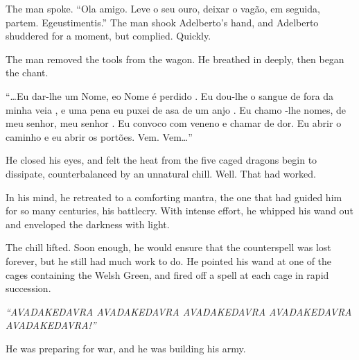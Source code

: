 The man spoke. “Ola amigo. Leve o seu ouro, deixar o vagão, em seguida, partem. Egeustimentis.” The man shook Adelberto’s hand, and Adelberto shuddered for a moment, but complied. Quickly.

The man removed the tools from the wagon. He breathed in deeply, then began the chant.

“…Eu dar-lhe um Nome, eo Nome é perdido . Eu dou-lhe o sangue de fora da minha veia , e uma pena eu puxei de asa de um anjo . Eu chamo -lhe nomes, de meu senhor, meu senhor . Eu convoco com veneno e chamar de dor. Eu abrir o caminho e eu abrir os portões. Vem. Vem…”

He closed his eyes, and felt the heat from the five caged dragons begin to dissipate, counterbalanced by an unnatural chill. Well. That had worked.

In his mind, he retreated to a comforting mantra, the one that had guided him for so many centuries, his battlecry. With intense effort, he whipped his wand out and enveloped the darkness with light.

The chill lifted. Soon enough, he would ensure that the counterspell was lost forever, but he still had much work to do. He pointed his wand at one of the cages containing the Welsh Green, and fired off a spell at each cage in rapid succession.

\emph{“AVADAKEDAVRA AVADAKEDAVRA AVADAKEDAVRA AVADAKEDAVRA AVADAKEDAVRA!”}

He was preparing for war, and he was building his army.